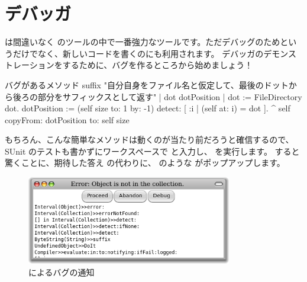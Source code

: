 \documentclass[a4paper,10pt,twoside]{book}
\begin{document}
%

\section{デバッガ}

 は間違いなく \pharo のツールの中で一番強力なツールです。ただデバッグのためというだけでなく、新しいコードを書くのにも利用されます。
デバッガのデモンストレーションをするために、バグを作るところから始めましょう！


\begin{method}[buggy]{バグがあるメソッド}
suffix
"自分自身をファイル名と仮定して、最後のドットから後ろの部分をサフィックスとして返す"
| dot dotPosition |
dot := FileDirectory dot.
dotPosition := (self size to: 1 by: -1) detect: [ :i | (self at: i) = dot ].
^ self copyFrom: dotPosition to: self size
\end{method}

もちろん、こんな簡単なメソッドは動くのが当たり前だろうと確信するので、SUnit のテストも書かずにワークスペースで  と入力し、
 を実行します。
すると驚くことに、期待した答え  の代わりに、  のような  がポップアップします。

\begin{figure}[btp]
\begin{center}
\includegraphics[width=0.8\textwidth]{PreDebugWindow}
\end{center}
\caption{  によるバグの通知}
\end{figure}
\end{document}
